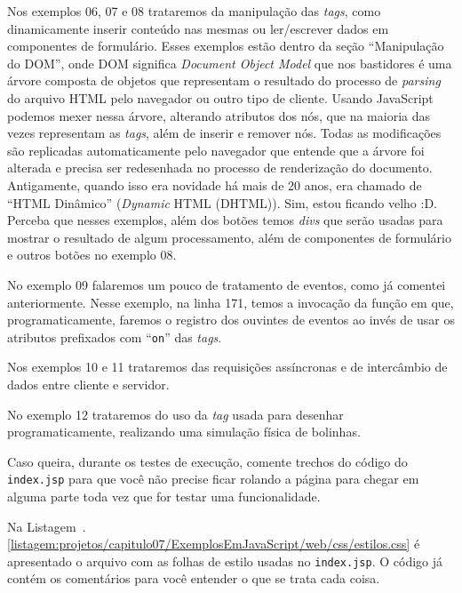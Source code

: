 Nos exemplos 06, 07 e 08 trataremos da manipulação das \textit{tags}, como dinamicamente inserir conteúdo nas mesmas ou ler/escrever dados em componentes de formulário. Esses exemplos estão dentro da seção ``Manipulação do DOM'', onde DOM significa \textit{Document Object Model} que nos bastidores é uma árvore composta de objetos que representam o resultado do processo de \textit{parsing} do arquivo HTML pelo navegador ou outro tipo de cliente. Usando JavaScript podemos mexer nessa árvore, alterando atributos dos nós, que na maioria das vezes representam as \textit{tags}, além de inserir e remover nós. Todas as modificações são replicadas automaticamente pelo navegador que entende que a árvore foi alterada e precisa ser redesenhada no processo de renderização do documento. Antigamente, quando isso era novidade há mais de 20 anos, era chamado de ``HTML Dinâmico'' (\textit{Dynamic} HTML (DHTML)). Sim, estou ficando velho :D. Perceba que nesses exemplos, além dos botões temos \textit{divs} que serão usadas para mostrar o resultado de algum processamento, além de componentes de formulário e outros botões no exemplo 08.

No exemplo 09 falaremos um pouco de tratamento de eventos, como já comentei anteriormente. Nesse exemplo, na linha 171, temos a invocação da função\newline%
 em que, programaticamente, faremos o registro dos ouvintes de eventos ao invés de usar os atributos prefixados com ``\texttt{on}'' das \textit{tags}.

Nos exemplos 10 e 11 trataremos das requisições assíncronas e de intercâmbio de dados entre cliente e servidor.

No exemplo 12 trataremos do uso da \textit{tag}  usada para desenhar programaticamente, realizando uma simulação física de bolinhas.


Caso queira, durante os testes de execução, comente trechos do código do \texttt{index.jsp} para que você não precise ficar rolando a página para chegar em alguma parte toda vez que for testar uma funcionalidade.

Na Listagem~\thechapter.\ref{listagem:projetos/capitulo07/ExemplosEmJavaScript/web/css/estilos.css} é apresentado o arquivo com as folhas de estilo usadas no \texttt{index.jsp}. O código já contém os comentários para você entender o que se trata cada coisa.

